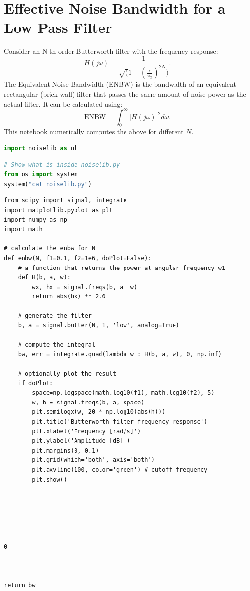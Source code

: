 \hypertarget{effective-noise-bandwidth-for-a-low-pass-filter}{%
\section{Effective Noise Bandwidth for a Low Pass
Filter}\label{effective-noise-bandwidth-for-a-low-pass-filter}}

Consider an N-th order Butterworth filter with the frequency response:
\[H(j\omega)=\frac{1}{\sqrt(1+(\frac{s}{\omega_O})^{2N})}.\] The
Equivalent Noise Bandwidth (ENBW) is the bandwidth of an equivalent
rectangular (brick wall) filter that passes the same amount of noise
power as the actual filter. It can be calculated using:
\[\text{ENBW}=\int_{0}^{\infty} |H(j\omega)|^2 d\omega.\] This notebook
numerically computes the above for different \(N\).

\begin{lstlisting}[language=Python]
import noiselib as nl
\end{lstlisting}

\begin{lstlisting}[language=Python]
# Show what is inside noiselib.py
from os import system
system("cat noiselib.py")
\end{lstlisting}

\begin{lstlisting}
from scipy import signal, integrate
import matplotlib.pyplot as plt
import numpy as np
import math

# calculate the enbw for N
def enbw(N, f1=0.1, f2=1e6, doPlot=False):
    # a function that returns the power at angular frequency w1
    def H(b, a, w):
        wx, hx = signal.freqs(b, a, w)
        return abs(hx) ** 2.0

    # generate the filter
    b, a = signal.butter(N, 1, 'low', analog=True) 
    
    # compute the integral
    bw, err = integrate.quad(lambda w : H(b, a, w), 0, np.inf)  
    
    # optionally plot the result
    if doPlot:
        space=np.logspace(math.log10(f1), math.log10(f2), 5)
        w, h = signal.freqs(b, a, space)
        plt.semilogx(w, 20 * np.log10(abs(h)))
        plt.title('Butterworth filter frequency response')
        plt.xlabel('Frequency [rad/s]')
        plt.ylabel('Amplitude [dB]')
        plt.margins(0, 0.1)
        plt.grid(which='both', axis='both')
        plt.axvline(100, color='green') # cutoff frequency
        plt.show()
        
    




0



return bw
\end{lstlisting}

